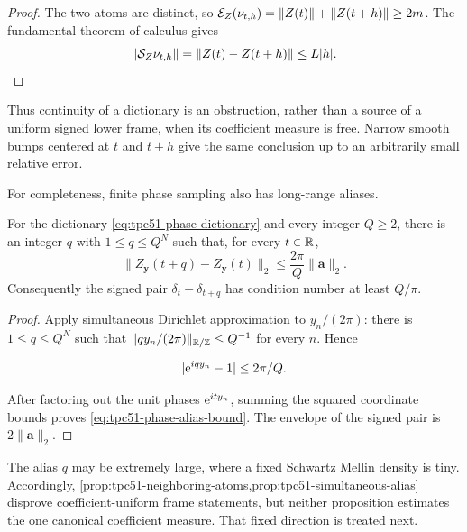 \begin{proof}
The two atoms are distinct, so
\(\mathcal E_Z(\nu_{t,h})=\|Z(t)\|+\|Z(t+h)\|\ge2m\).
The fundamental theorem of calculus gives
\[
 \|\mathcal S_Z\nu_{t,h}\|
 =\|Z(t)-Z(t+h)\|
 \le L|h|.
\]
\end{proof}

Thus continuity of a dictionary is an obstruction, rather than a
source of a uniform signed lower frame, when its coefficient measure is
free.  Narrow smooth bumps centered at \(t\) and \(t+h\) give the same
conclusion up to an arbitrarily small relative error.

For completeness, finite phase sampling also has long-range aliases.

\begin{proposition}
\label{prop:tpc51-simultaneous-alias}
For the dictionary \eqref{eq:tpc51-phase-dictionary} and every integer
\(Q\ge2\), there is an integer \(q\) with
\(1\le q\le Q^N\) such that, for every \(t\in\mathbb R\),
\begin{equation}
 \|Z_{\bm y}(t+q)-Z_{\bm y}(t)\|_2
 \le\frac{2\pi}{Q}\|\bm a\|_2.
 \label{eq:tpc51-phase-alias-bound}
\end{equation}
Consequently the signed pair
\(\delta_t-\delta_{t+q}\) has condition number at least \(Q/\pi\).
\end{proposition}

\begin{proof}
Apply simultaneous Dirichlet approximation to
\(y_n/(2\pi)\): there is \(1\le q\le Q^N\) such that
\(\|qy_n/(2\pi)\|_{\mathbb R/\mathbb Z}\le Q^{-1}\) for every \(n\).
Hence

\[
 |\mathrm e^{iqy_n}-1|\le2\pi/Q.
\]

After factoring out the unit phases \(\mathrm e^{ity_n}\), summing the
squared coordinate bounds proves
\eqref{eq:tpc51-phase-alias-bound}.  The envelope of the signed pair is
\(2\|\bm a\|_2\).
\end{proof}

The alias \(q\) may be extremely large, where a fixed Schwartz Mellin
density is tiny.  Accordingly,
\cref{prop:tpc51-neighboring-atoms,prop:tpc51-simultaneous-alias}
disprove coefficient-uniform frame statements, but neither proposition
estimates the one canonical coefficient measure.  That fixed direction
is treated next.
